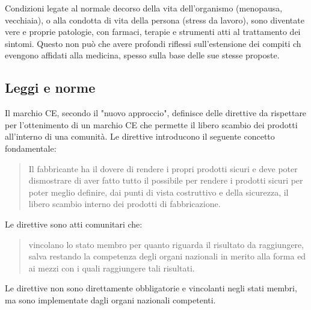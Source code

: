 \documentclass[a4paper]{article}
\begin{document}
Condizioni legate al normale decorso della vita dell'organismo (menopausa, vecchiaia), 
o alla condotta di vita della persona (stress da lavoro), sono diventate vere e proprie 
patologie, con farmaci, terapie e strumenti atti al trattamento dei sintomi. Questo non 
può che avere profondi riflessi sull'estensione dei compiti ch evengono affidati alla 
medicina, spesso sulla base delle sue stesse proposte.

\subsection{Leggi e norme}
Il marchio CE, secondo il "nuovo approccio", definisce delle direttive da rispettare per 
l'ottenimento di un marchio CE che permette il libero scambio dei prodotti all'interno 
di una comunità. Le direttive introducono il seguente concetto fondamentale: 
\begin{quote}
    \centering
    Il fabbricante ha il dovere di rendere i propri prodotti sicuri e deve poter 
    dismostrare di aver fatto tutto il possibile per rendere i prodotti sicuri per poter 
    meglio definire, dai punti di vista costruttivo e della sicurezza, il libero scambio 
    interno dei prodotti di fabbricazione.
\end{quote}
Le direttive sono atti comunitari che:
\begin{quote}
    \centering
    vincolano lo stato membro per quanto riguarda il risultato da raggiungere, salva 
    restando la competenza degli organi nazionali in merito alla forma ed ai mezzi con 
    i quali raggiungere tali risultati.
\end{quote}
Le direttive non sono direttamente obbligatorie e vincolanti negli stati membri, ma sono 
implementate dagli organi nazionali competenti.
\end{document}
